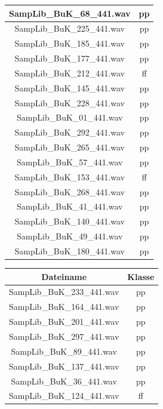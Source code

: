 \begin{table}[H]
\begin{minipage}[b]{0.4\textwidth}
\begin{tabular}{ | c | c | }
    \hline
    SampLib\_BuK\_68\_441.wav & pp \\
    \hline
    SampLib\_BuK\_225\_441.wav & pp \\
    \hline
    SampLib\_BuK\_185\_441.wav & pp \\
    \hline
    SampLib\_BuK\_177\_441.wav & pp \\
    \hline
    SampLib\_BuK\_212\_441.wav & ff \\
    \hline
    SampLib\_BuK\_145\_441.wav & pp \\
    \hline
    SampLib\_BuK\_228\_441.wav & pp \\
    \hline
    SampLib\_BuK\_01\_441.wav & pp \\
    \hline
    SampLib\_BuK\_292\_441.wav & pp \\
    \hline
    SampLib\_BuK\_265\_441.wav & pp \\
    \hline
    SampLib\_BuK\_57\_441.wav & pp \\
    \hline
    SampLib\_BuK\_153\_441.wav & ff \\
    \hline
    SampLib\_BuK\_268\_441.wav & pp \\
    \hline
    SampLib\_BuK\_41\_441.wav & pp \\
    \hline
    SampLib\_BuK\_140\_441.wav & pp \\
    \hline
    SampLib\_BuK\_49\_441.wav & pp \\
    \hline
    SampLib\_BuK\_180\_441.wav & pp \\
    \hline
  \end{tabular}
\end{minipage}
\hfill
\begin{minipage}[b]{0.4\textwidth}
  \begin{tabular}{ | c | c | }
    \hline
    Dateiname & Klasse \\
    \hline
    SampLib\_BuK\_233\_441.wav & pp \\
    \hline
    SampLib\_BuK\_164\_441.wav & pp \\
    \hline
    SampLib\_BuK\_201\_441.wav & pp \\
    \hline
    SampLib\_BuK\_297\_441.wav & pp \\
    \hline
    SampLib\_BuK\_89\_441.wav & pp \\
    \hline
    SampLib\_BuK\_137\_441.wav & pp \\
    \hline
    SampLib\_BuK\_36\_441.wav & pp \\
    \hline
    SampLib\_BuK\_124\_441.wav & ff \\
    \hline

\end{tabular}
\end{minipage}
\end{table}
